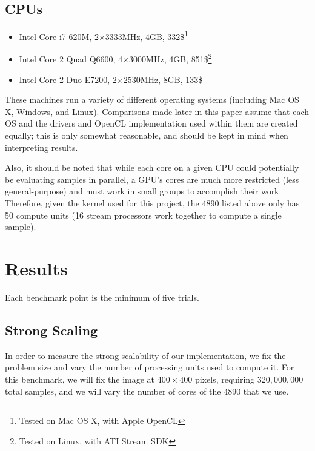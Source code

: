 \documentclass{acmsiggraph}
\begin{document}
\subsection{CPUs}

\begin{itemize}

\item Intel Core i7 620M, 2$\times$3333MHz, 4GB, 332\$\footnote{Tested on Mac OS X, with Apple OpenCL\label{fn:osx}}

\item Intel Core 2 Quad Q6600, 4$\times$3000MHz, 4GB, 851\$\footnote{Tested on Linux, with ATI Stream SDK\label{fn:linux}}

\item Intel Core 2 Duo E7200, 2$\times$2530MHz, 8GB, 133\$

\end{itemize}

These machines run a variety of different operating systems (including Mac OS X, Windows, and Linux). Comparisons made later in this paper assume that each OS and the drivers and OpenCL implementation used within them are created equally; this is only somewhat reasonable, and should be kept in mind when interpreting results.

Also, it should be noted that while each core on a given CPU could potentially be evaluating samples in parallel, a GPU's cores are much more restricted (less general-purpose) and must work in small groups to accomplish their work. Therefore, given the kernel used for this project, the 4890 listed above only has 50 compute units (16 stream processors work together to compute a single sample).

\section{Results}

Each benchmark point is the minimum of five trials.

\subsection{Strong Scaling}

\label{strongScaling}

In order to measure the strong scalability of our implementation, we fix the problem size and vary the number of processing units used to compute it. For this benchmark, we will fix the image at $400\times400$ pixels, requiring $320,000,000$ total samples, and we will vary the number of cores of the 4890 that we use.
\end{document}
